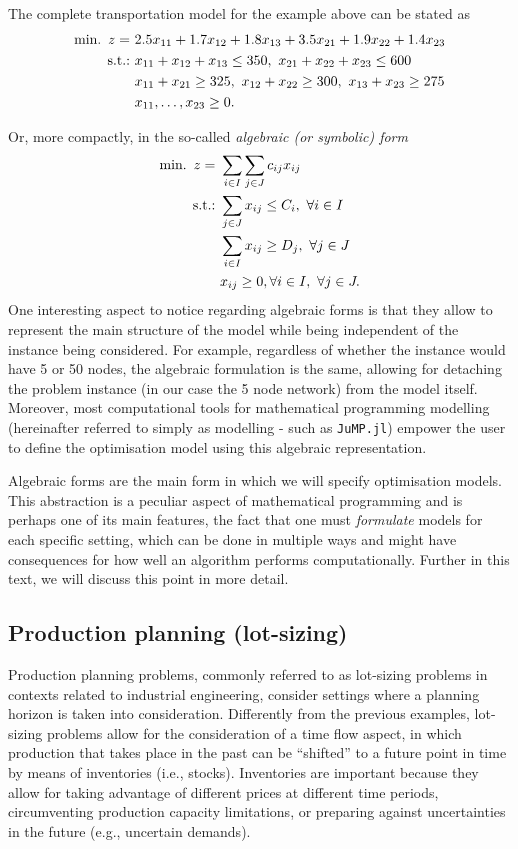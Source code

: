 The complete transportation model for the example above can be stated as 
%
\begin{align*}
	\mini z = \ &2.5x_{11} + 1.7x_{12} + 1.8x_{13} + 3.5x_{21} + 1.9x_{22} + 1.4x_{23} \\
	\st & x_{11} + x_{12} + x_{13} \leq 350, \ 
	x_{21} + x_{22} + x_{23} \leq 600\\
	& x_{11} + x_{21} \geq 325, \ x_{12} + x_{22} \geq 300, \ x_{13} + x_{23} \geq 275\\
	& x_{11}, \dots, x_{23} \geq 0.
\end{align*}
%

Or, more compactly, in the so-called \emph{algebraic (or symbolic) form}
%
\begin{align*}
	\mathop{\text{min.~}} z = \ &\sum_{i \in I}\sum_{j \in J}c_{ij}x_{ij} \\
	\mathop{\text{s.t.:~}} & \sum_{j \in J} x_{ij} \leq C_i, ~\forall i \in I \\
	& \sum_{i \in I} x_{ij} \geq D_j, ~\forall j \in J \\
	&x_{ij} \geq 0, \forall i \in I, ~\forall j \in J.
\end{align*}
%
One interesting aspect to notice regarding algebraic forms is that they allow to represent the main structure of the model while being independent of the instance being considered. For example, regardless of whether the instance would have 5 or 50 nodes, the algebraic formulation is the same, allowing for detaching the problem instance (in our case the 5 node network) from the model itself. Moreover, most computational tools for mathematical programming modelling (hereinafter referred to simply as modelling - such as \texttt{JuMP.jl}) empower the user to define the optimisation model using this algebraic representation.

Algebraic forms are the main form in which we will specify optimisation models. This abstraction is a peculiar aspect of mathematical programming and is perhaps one of its main features, the fact that one must \emph{formulate} models for each specific setting, which can be done in multiple ways and might have consequences for how well an algorithm performs computationally. Further in this text, we will discuss this point in more detail.  


\subsection{Production planning (lot-sizing)}

Production planning problems, commonly referred to as lot-sizing problems in contexts related to industrial engineering, consider settings where a planning horizon is taken into consideration. Differently from the previous examples, lot-sizing problems allow for the consideration of a time flow aspect, in which production that takes place in the past can be ``shifted'' to a future point in time by means of inventories (i.e., stocks). Inventories are important because they allow for taking advantage of different prices at different time periods, circumventing production capacity limitations, or preparing against uncertainties in the future (e.g., uncertain demands).

